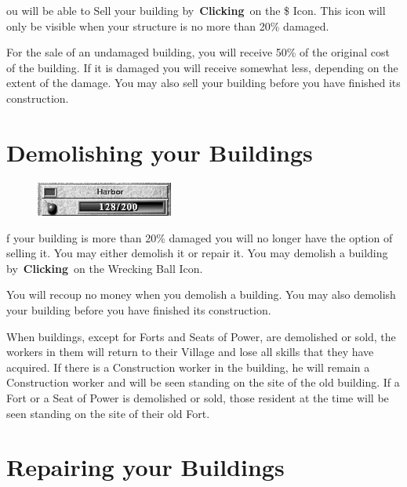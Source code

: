 ou will be able to Sell your building by \textbf{Clicking} on the \$ Icon. This icon will only be visible when your structure is no more than 20\% damaged.

For the sale of an undamaged building, you will receive 50\% of the original cost of the building. If it is damaged you will receive somewhat less, depending on the extent of the damage. You may also sell your building before you have finished its construction.

\section{Demolishing your Buildings}

	
\begin{figure}
	\vspace{-20pt}
	\begin{center}
		\includegraphics[width=0.4\textwidth]{Idamage}
	\end{center}
	\vspace{-20pt}
\end{figure}

f your building is more than 20\% damaged you will no longer have the option of selling it. You may either demolish it or repair it. You may demolish a building by \textbf{Clicking} on the Wrecking Ball Icon.

You will recoup no money when you demolish a building. You may also demolish your building before you have finished its construction.

When buildings, except for Forts and Seats of Power, are demolished or sold, the workers in them will return to their Village and lose all skills that they have acquired. If there is a Construction worker in the building, he will remain a Construction worker and will be seen standing on the site of the old building. If a Fort or a Seat of Power is demolished or sold, those resident at the time will be seen standing on the site of their old Fort.

\section{Repairing your Buildings}

